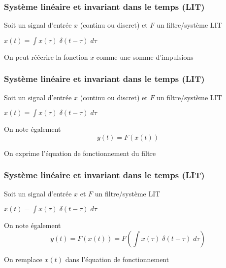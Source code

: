 \documentclass{beamer}
\begin{document}
\begin{frame} 
\frametitle{Système linéaire et invariant dans le temps (LIT) }
Soit un signal d'entrée $x$ (continu ou discret) et $F$ un filtre/système LIT\\
\vspace{1 cm}
\begin{center}
$x(t) = \displaystyle \int x(\tau)  \; \delta(t-\tau) \; d\tau$\\
\end{center}

\begin{block}{}
On peut réécrire la fonction $x$ comme une somme d'impulsions
\end{block}
\end{frame}

\begin{frame} 
\frametitle{Système linéaire et invariant dans le temps (LIT) }
Soit un signal d'entrée $x$ (continu ou discret) et $F$ un filtre/système LIT\\
\vspace{1 cm}
\begin{center}
$x(t) = \displaystyle \int x(\tau)  \; \delta(t-\tau) \; d\tau$\\
\end{center}

On note également 
\[y(t) = F(x(t))\]

 \begin{block}{}
On exprime l'équation de fonctionnement du filtre
\end{block}
\end{frame}

\begin{frame} 
\frametitle{Système linéaire et invariant dans le temps (LIT) }
Soit un signal d'entrée $x$  et $F$ un filtre/système LIT\\
\vspace{1 cm}
\begin{center}
$x(t) = \displaystyle \int x(\tau)  \; \delta(t-\tau) \; d\tau$\\
\end{center}

On note également 
\[y(t) = F(x(t)) = F(\int x(\tau)  \; \delta(t-\tau) \; d\tau)\]

 \begin{block}{}
On remplace $x(t)$ dans l'équation de fonctionnement
\end{block}
\end{frame}
\end{document}
